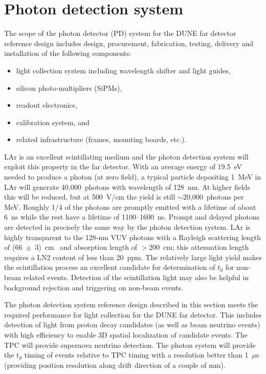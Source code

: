 
\section{Photon detection system}
\label{sec:pd_system}

The scope of the photon detector (PD) system for the DUNE far detector
reference design includes design, procurement, fabrication,
testing, delivery and installation of the following components:
\begin{itemize}
\item light collection system including wavelength shifter and light guides,
\item silicon photo-multipliers (SiPMs),
\item readout electronics,
\item calibration system, and
\item related infrastructure (frames, mounting boards, etc.).
\end{itemize}

LAr is an excellent scintillating medium and the photon detection
system will exploit this property in the far detector.  With an
average energy of 19.5~eV needed to produce a photon (at zero field),
a typical particle depositing 1~MeV in LAr will generate
40,000~photons with wavelength of 128~nm. At higher fields this will
be reduced, but at 500~V/cm the yield is still $\sim$20,000~photons
per MeV. Roughly 1/4 of the photons are promptly emitted with a
lifetime of about 6~ns while the rest have a lifetime of
1100--1600~ns. Prompt and delayed photons are detected in
  precisely the same way by the photon detection system. LAr is
highly transparent to the 128-nm VUV photons with a Rayleigh
scattering length of (66~$\pm$~3)~cm~\cite{Rayleigh} and absorption
length of $>$200~cm; this attenuation length requires a LN2
  content of less than 20~ppm. The relatively large light yield makes
the scintillation process an excellent candidate for determination of
$t_0$ for non-beam related events. Detection of the scintillation
light may also be helpful in background rejection and triggering on
non-beam events.

The photon detection system reference design described in this section
meets the required performance for light collection for the DUNE far
detector. This includes detection of light from proton decay
candidates (as well as beam neutrino events) with high efficiency to
enable 3D spatial localization of candidate events. The TPC will
provide supernova neutrino detection. 
The photon system will provide the $t_0$ timing of
events relative to TPC timing with a resolution better than 1~$\mu$s
(providing position resolution along drift direction of a couple of mm). 

